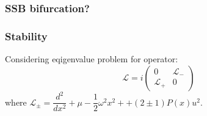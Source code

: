 \documentclass{beamer}
\begin{document}
\begin{frame}
\frametitle{SSB bifurcation?}

\begin{figure}
\label{pic:diagram_ssb}
\end{figure}

\end{frame}


\begin{frame}
\frametitle{Stability}
Considering eqigenvalue problem for operator\footnotemark[5]:
\begin{equation}
\mathcal{L} = i \begin{pmatrix} 0 & \mathcal{L}_- \\ \mathcal{L}_+ & 0 \end{pmatrix}
\end{equation}
where $\mathcal{L}_\pm = \dfrac{d^2}{dx^2} + \mu - \dfrac{1}{2} \omega^2 x^2 + + (2 \pm 1) P(x) u^2$.

\begin{figure}
\label{pic:stability}
\end{figure}

\end{frame}
\end{document}
